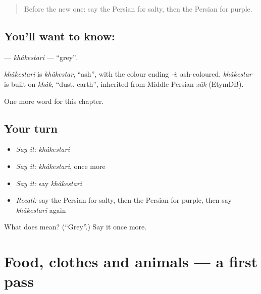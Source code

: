 \begin{quote}
Before the new one: say the Persian for salty, then the Persian for purple.
\end{quote}

\subsection*{You'll want to know: }
\textbf{} — \emph{khâkestari} — \textquotedblleft{}grey\textquotedblright{}.

\begin{cousinweb}
\emph{khâkestari} is \emph{khâkestar}, \textquotedblleft{}ash\textquotedblright{}, with the colour ending \emph{-i}: ash-coloured. \emph{khâkestar} is built on \emph{khâk}, \textquotedblleft{}dust, earth\textquotedblright{}, inherited from Middle Persian \emph{xāk} (EtymDB).
\end{cousinweb}

\begin{grammarlens}[title={What you've built}]
One more word for this chapter.
\end{grammarlens}

\subsection*{Your turn}
\begin{itemize}
\raggedright
  \item \emph{Say it:} \emph{khâkestari}
  \item \emph{Say it:} \emph{khâkestari}, once more
  \item \emph{Say it:} say \emph{khâkestari}
  \item \emph{Recall:} say the Persian for salty, then the Persian for purple, then say \emph{khâkestari} again
\end{itemize}

\begin{tcolorbox}[breakable,colback=teal!4,colframe=teal!35!black,title={Before you move on}]
What does  mean? (\textquotedblleft{}Grey\textquotedblright{}.) Say it once more.
\end{tcolorbox}
\section[(dialogue)]{Food, clothes and animals — a first pass}

\label{lesson:FA-R127-first-pass-food-clothes-and-animals}




